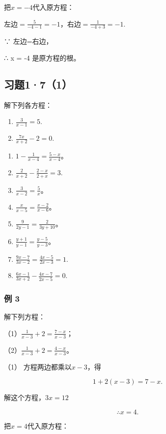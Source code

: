  把\(x = -4\)代入原方程：

左边\(= \frac{5}{-4 - 1} = -1\)，右边\(= \frac{1}{-4 + 3} = -1.\)

∵ 左边=右边，

∴ x = -4 是原方程的根。

\subsection{习题1·7（1）}

解下列各方程：

\begin{enumerate}[start=1]
\item
  \(\frac{3}{x - 1} = 5.\)
\item
  \(\frac{7x}{x + 2} - 2 = 0.\)
\end{enumerate}

\begin{enumerate}[start=3]
\item
  \(1 - \frac{1}{x - 4} = \frac{5 - x}{x - 4}\)。
\item
  \(\frac{2}{x + 2} -\frac{2 - x}{2 + x} = 3.\)
\item
  \(\frac{3}{x - 2} = \frac{5}{x}\)。
\item
  \(\frac{x}{x - 5} = \frac{x - 2}{x - 6}\)。
\item
  \(\frac{9}{2y - 1} = \frac{2}{3y + 10}\)。
\item
  \(\frac{y + 1}{y - 1} = \frac{y - 5}{y - 3}\)。
\item
  \(\frac{9x - 7}{3x - 2} = \frac{4x - 5}{2x - 3} = 1.\)
\item
  \(\frac{6x - 1}{3x + 2} -\frac{4x - 7}{2x - 5} = 0.\)
\end{enumerate}

\subsubsection{例 3}

解下列方程：

（1）\(\frac{1}{x - 3} + 2 = \frac{7 - x}{x - 3}\)；

（2）\(\frac{1}{x - 3} + 2 = \frac{4 - x}{x - 3}\)。

 （1） 方程两边都乘以\(x - 3\)，得

\[
1 + 2 (x - 3) = 7 - x.
\]

解这个方程，\(3x = 12\)

\[
\therefore x = 4.
\]

 把\(x = 4\)代入原方程：

